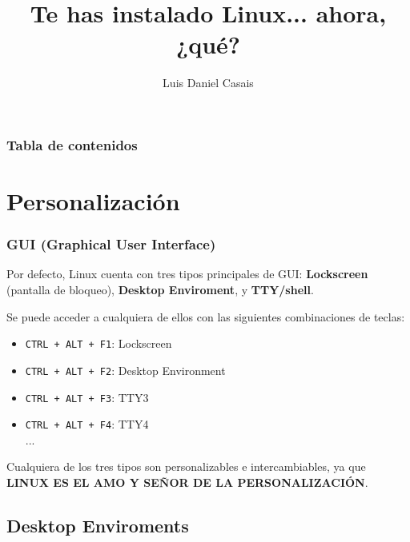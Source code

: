 \documentclass[aspectratio=43]{beamer}
\title{Te has instalado Linux... ahora, ¿qué?} %
\author{Luis Daniel Casais} %
\institute{\edicion \ Jornadas Técnicas del GUL}
\date{\fecha}
\begin{document}
{
    \begin{frame}
        \titlepage
    \end{frame}
}
\addtocounter{framenumber}{-1}


\begin{frame}
    \frametitle{Tabla de contenidos}
    \begin{multicols}{2}
        \tableofcontents
    \end{multicols}
\end{frame}





\section{Personalización}


\begin{frame}
    \frametitle{GUI (Graphical User Interface)}
    Por defecto, Linux cuenta con tres tipos principales de GUI: \textbf{Lockscreen} (pantalla de bloqueo), \textbf{Desktop Enviroment}, y \textbf{TTY/shell}.\newline

    Se puede acceder a cualquiera de ellos con las siguientes combinaciones de teclas:
    \begin{itemize}
        \item \texttt{CTRL + ALT + F1}: Lockscreen
        \item \texttt{CTRL + ALT + F2}: Desktop Environment
        \item \texttt{CTRL + ALT + F3}: TTY3
        \item \texttt{CTRL + ALT + F4}: TTY4\\
        ...\newline
    \end{itemize}
    
    Cualquiera de los tres tipos son personalizables e intercambiables, ya que \textbf{LINUX ES EL AMO Y SEÑOR DE LA PERSONALIZACIÓN}.
\end{frame}

\subsection{Desktop Enviroments}
\end{document}
